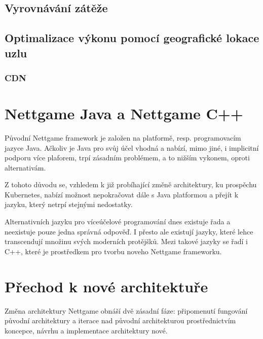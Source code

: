 \documentclass{article}
\begin{document}
\subsection{Vyrovnávání zátěže}

\subsection{Optimalizace výkonu pomocí geografické lokace uzlu}

\subsubsection{CDN}

\newpage
\section{Nettgame Java a Nettgame C++}
Původní Nettgame framework je založen na platformě, resp. programovacím jazyce Java. Ačkoliv je Java pro svůj účel vhodná a nabízí, mimo jiné, i implicitní podporu více plaforem, trpí zásadním problémem, a to nižším vykonem, oproti alternativám.

Z tohoto důvodu se, vzhledem k již probíhající změně architektury, ku prospěchu Kubernetes, nabízí možnost nepokračovat dále s Java platformou a přejít k jazyku, který netrpí stejnými nedostatky.

Alternativních jazyku pro víceúčelové programování dnes existuje řada a neexistuje pouze jedna správná odpověď. I přesto ale existují jazyky, které lehce transcendují množinu svých moderních protějšků. Mezi takové jazyky se řadí i C++, které je prostředkem pro tvorbu noveho Nettgame frameworku.
\newpage
\section{Přechod k nové architektuře}

Změna architektury Nettgame obnáší dvě zásadní fáze: připomenutí fungování původní architektury a iterace nad původní architekturou prostřednictvím koncepce, návrhu a implementace architektury nové.
\end{document}
